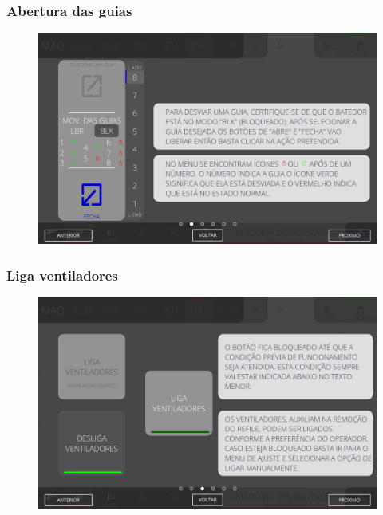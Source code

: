 \newpage
\thispagestyle{fancy}
\vspace*{40 pt}
\subsubsection{\small{Abertura das guias}} \label{sec:comandosBatedorAberturaGuias}
\vspace*{\fill}
\begin{figure}[h]
    \centering
    \includegraphics[width=576 px,height=360 px]{src/imagesICV/07-scout/commands/2.png}
\end{figure}
\vspace*{\fill}

\newpage
\thispagestyle{fancy}
\vspace*{40 pt}
\subsubsection{\small{Liga ventiladores}} \label{sec:comandosBatedorLigaVentiladores}
\vspace*{\fill}
\begin{figure}[h]
    \centering
    \includegraphics[width=576 px,height=360 px]{src/imagesICV/07-scout/commands/3.png}
\end{figure}
\vspace*{\fill}

